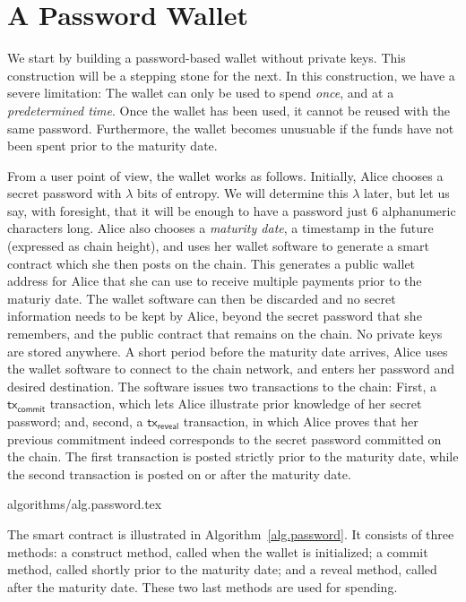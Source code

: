 \section{A Password Wallet}\label{sec:password}

We start by building a password-based wallet without private keys.
This construction will be a stepping stone for the next. In this construction, we
have a severe limitation: The wallet can only be used to spend \emph{once},
and at a \emph{predetermined time}. Once the wallet has been used, it cannot be
reused with the same password. Furthermore, the wallet becomes unusuable if the
funds have not been spent prior to the maturity date.

From a user point of view, the wallet works as follows. Initially, Alice chooses
a secret password with $\lambda$ bits of entropy. We will determine this $\lambda$
later, but let us say, with foresight, that it will be enough to have a password
just $6$ alphanumeric characters long. Alice also chooses a \emph{maturity date},
a timestamp in the future (expressed as chain height),
and uses her wallet software to generate
a smart contract which she then posts on the chain. This generates a public wallet
address for Alice that she can use to receive multiple payments prior to the maturiy date.
The wallet software can then
be discarded and no secret information needs to be kept by Alice, beyond the
secret password that she remembers, and the public contract that remains on the chain.
No private keys are stored anywhere.
A short period before the maturity date arrives,
Alice uses the wallet software to connect to the chain network, and enters her
password and desired destination. The software issues two transactions to the chain:
First, a $\textsf{tx}_\textsf{commit}$ transaction, which lets Alice illustrate prior
knowledge of her secret password; and, second, a $\textsf{tx}_\textsf{reveal}$ transaction,
in which Alice proves that her previous commitment indeed corresponds to the secret
password committed on the chain. The first transaction is posted strictly prior to the maturity
date, while the second transaction is posted on or after the maturity date.

{algorithms/alg.password.tex}

The smart contract is illustrated in
Algorithm~\ref{alg.password}. It consists of three methods: a \textsf{construct}
method, called when the wallet is initialized; a \textsf{commit} method, called
shortly prior to the maturity date; and a \textsf{reveal} method, called after
the maturity date. These two last methods are used for spending.

